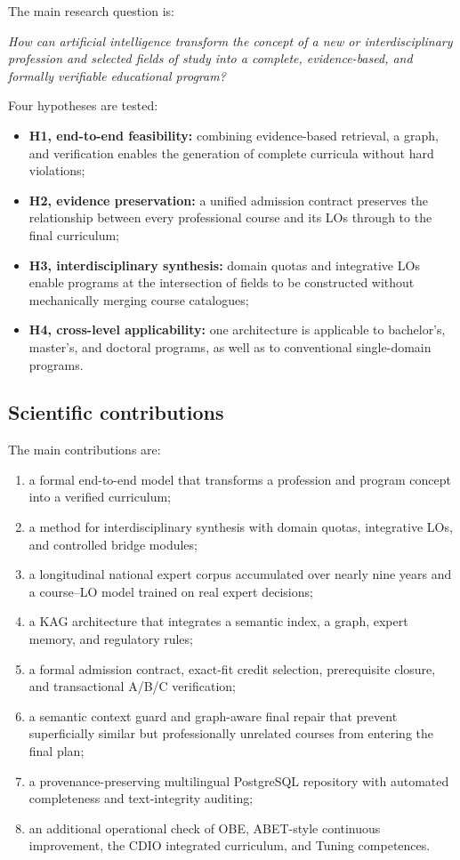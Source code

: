 \documentclass[twoside,11pt]{article}
\begin{document}
The main research question is:

\emph{How can artificial intelligence transform the concept of a new or interdisciplinary profession and selected fields of study into a complete, evidence-based, and formally verifiable educational program?}

Four hypotheses are tested:
\begin{itemize}
  \item \textbf{H1, end-to-end feasibility:} combining evidence-based retrieval, a graph, and verification enables the generation of complete curricula without hard violations;
  \item \textbf{H2, evidence preservation:} a unified admission contract preserves the relationship between every professional course and its LOs through to the final curriculum;
  \item \textbf{H3, interdisciplinary synthesis:} domain quotas and integrative LOs enable programs at the intersection of fields to be constructed without mechanically merging course catalogues;
  \item \textbf{H4, cross-level applicability:} one architecture is applicable to bachelor's, master's, and doctoral programs, as well as to conventional single-domain programs.
\end{itemize}

\subsection*{Scientific contributions}

The main contributions are:
\begin{enumerate}
  \item a formal end-to-end model that transforms a profession and program concept into a verified curriculum;
  \item a method for interdisciplinary synthesis with domain quotas, integrative LOs, and controlled bridge modules;
  \item a longitudinal national expert corpus accumulated over nearly nine years and a course--LO model trained on real expert decisions;
  \item a KAG architecture that integrates a semantic index, a graph, expert memory, and regulatory rules;
  \item a formal admission contract, exact-fit credit selection, prerequisite closure, and transactional A/B/C verification;
  \item a semantic context guard and graph-aware final repair that prevent superficially similar but professionally unrelated courses from entering the final plan;
  \item a provenance-preserving multilingual PostgreSQL repository with automated completeness and text-integrity auditing;
  \item an additional operational check of OBE, ABET-style continuous improvement, the CDIO integrated curriculum, and Tuning competences.
\end{enumerate}
\end{document}

